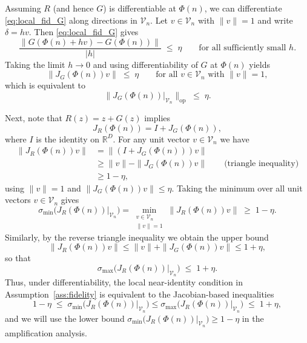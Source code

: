 \documentclass{article}
\theoremstyle{plain}
\theoremstyle{definition}
\theoremstyle{remark}
\begin{document}
Assuming $R$ (and hence $G$) is differentiable at $\Phi(n)$, we can
differentiate \eqref{eq:local_fid_G} along directions in $\mathcal{V}_n$.
Let $v\in\mathcal{V}_n$ with $\|v\|=1$ and write $\delta = h v$. Then
\eqref{eq:local_fid_G} gives
\begin{equation}
    \frac{\|G(\Phi(n)+h v) - G(\Phi(n))\|}{|h|}
    \;\le\; \eta
    \qquad \text{for all sufficiently small $h$.}
\end{equation}
Taking the limit $h\to 0$ and using differentiability of $G$ at
$\Phi(n)$ yields
\begin{equation}
    \|J_G(\Phi(n)) v\| \;\le\; \eta
    \qquad \text{for all $v\in\mathcal{V}_n$ with $\|v\|=1$},
\end{equation}
which is equivalent to
\begin{equation}
    \big\|J_G(\Phi(n))\big|_{\mathcal{V}_n}\big\|_{\mathrm{op}}
    \;\le\; \eta.
\end{equation}

Next, note that $R(z) = z + G(z)$ implies
\begin{equation}
    J_R(\Phi(n)) = I + J_G(\Phi(n)),
\end{equation}
where $I$ is the identity on $\mathbb{R}^D$. For any unit vector
$v\in\mathcal{V}_n$ we have
\begin{equation}
    \begin{aligned}
        \big\|J_R(\Phi(n)) v\big\|
        &= \big\|(I + J_G(\Phi(n))) v\big\| \\
        &\ge \|v\| - \|J_G(\Phi(n)) v\|
        \qquad\text{(triangle inequality)} \\
        &\ge 1 - \eta,
    \end{aligned}
\end{equation}
using $\|v\|=1$ and $\|J_G(\Phi(n)) v\|\le \eta$.
Taking the minimum over all unit vectors $v\in\mathcal{V}_n$ gives
\begin{equation}
    \sigma_{\min}\big(J_R(\Phi(n))\big|_{\mathcal{V}_n}\big)
    = \min_{\substack{v\in\mathcal{V}_n \\ \|v\|=1}}
      \big\|J_R(\Phi(n)) v\big\|
    \;\ge\; 1 - \eta.
\end{equation}
Similarly, by the reverse triangle inequality we obtain the upper bound
\begin{equation}
    \big\|J_R(\Phi(n)) v\big\|
    \le \|v\| + \|J_G(\Phi(n)) v\|
    \le 1 + \eta,
\end{equation}
so that
\begin{equation}
    \sigma_{\max}\big(J_R(\Phi(n))\big|_{\mathcal{V}_n}\big)
    \;\le\; 1 + \eta.
\end{equation}
Thus, under differentiability, the local near-identity condition in
Assumption~\ref{ass:fidelity} is equivalent to the Jacobian-based
inequalities
\begin{equation}
    1 - \eta
    \;\le\;
    \sigma_{\min}\big(J_{R}(\Phi(n))\big|_{\mathcal{V}_n}\big)
    \le
    \sigma_{\max}\big(J_{R}(\Phi(n))\big|_{\mathcal{V}_n}\big)
    \;\le\; 1 + \eta,
\end{equation}
and we will use the lower bound
$\sigma_{\min}\big(J_{R}(\Phi(n))\big|_{\mathcal{V}_n}\big)\ge 1-\eta$
in the amplification analysis.
\end{document}
